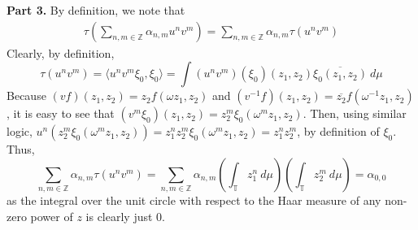 \documentclass[aps,pra,showpacs,notitlepage,onecolumn,superscriptaddress,nofootinbib]{revtex4-1}
\theoremstyle{definition}
\begin{document}
    \noindent \textbf{Part 3.} By definition, we note that
    \begin{align}
     \tau \left( \displaystyle\sum_{n, m \in \mathbb{Z}} \alpha_{n, m} u^n v^m \right) = \displaystyle\sum_{n, m \in \mathbb{Z}} \alpha_{n, m} \tau(u^{n} v^{m})
    \end{align}
    Clearly, by definition,
    \begin{equation}
      \tau(u^n v^m) = \langle u^n v^m \xi_0, \xi_0 \rangle = \displaystyle\int (u^n v^m)(\xi_0)(z_1, z_2) \overline{\xi_0(z_1, z_2)} \ d\mu
    \end{equation}
    Because $(v f)(z_1, z_2) = z_2 f(\omega z_1, z_2)$ and $(v^{-1} f)(z_1, z_2) = \overline{z_2} f(\omega^{-1} z_1, z_2)$, it is easy to see that $(v^m \xi_0)(z_1, z_2) = z_2^{m} \xi_0(\omega^m z_1, z_2)$.
    Then, using similar logic, $u^n (z_2^{m} \xi_0(\omega^m z_1, z_2)) = z_1^{n} z_2^{m} \xi_0(\omega^m z_1, z_2) = z_1^{n} z_2^{m}$, by definition of $\xi_0$. Thus,
    \begin{equation}
      \displaystyle\sum_{n, m \in \mathbb{Z}} \alpha_{n, m} \tau(u^{n} v^{m}) = \displaystyle\sum_{n, m \in \mathbb{Z}} \alpha_{n, m} \left( \displaystyle\int_{\mathbb{T}} z_1^{n} \ d\mu \right) \left( \displaystyle\int_{\mathbb{T}} z_2^{m} \ d\mu \right) = \alpha_{0, 0}
    \end{equation}
    as the integral over the unit circle with respect to the Haar measure of any non-zero power of $z$ is clearly just $0$.
    \newline
\end{document}
